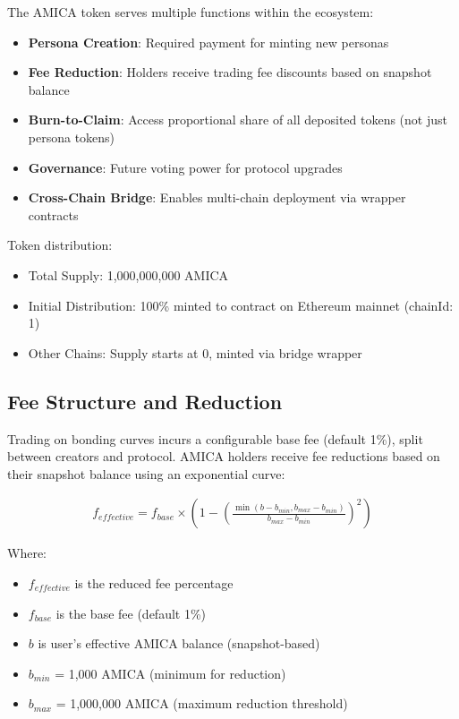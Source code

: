 \documentclass{article}
\begin{document}
The AMICA token serves multiple functions within the ecosystem:

\begin{itemize}
    \item \textbf{Persona Creation}: Required payment for minting new personas
    \item \textbf{Fee Reduction}: Holders receive trading fee discounts based on snapshot balance
    \item \textbf{Burn-to-Claim}: Access proportional share of all deposited tokens (not just persona tokens)
    \item \textbf{Governance}: Future voting power for protocol upgrades
    \item \textbf{Cross-Chain Bridge}: Enables multi-chain deployment via wrapper contracts
\end{itemize}

Token distribution:
\begin{itemize}
    \item Total Supply: 1,000,000,000 AMICA
    \item Initial Distribution: 100\% minted to contract on Ethereum mainnet (chainId: 1)
    \item Other Chains: Supply starts at 0, minted via bridge wrapper
\end{itemize}

\subsection{Fee Structure and Reduction}

Trading on bonding curves incurs a configurable base fee (default 1\%), split between creators and protocol. AMICA holders receive fee reductions based on their snapshot balance using an exponential curve:

\begin{align}
f_{effective} = f_{base} \times \left(1 - \left(\frac{\min(b - b_{min}, b_{max} - b_{min})}{b_{max} - b_{min}}\right)^2\right)
\end{align}

Where:
\begin{itemize}
    \item $f_{effective}$ is the reduced fee percentage
    \item $f_{base}$ is the base fee (default 1\%)
    \item $b$ is user's effective AMICA balance (snapshot-based)
    \item $b_{min}$ = 1,000 AMICA (minimum for reduction)
    \item $b_{max}$ = 1,000,000 AMICA (maximum reduction threshold)
\end{itemize}
\end{document}
